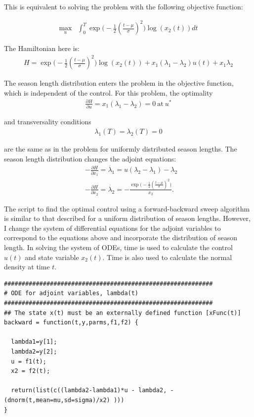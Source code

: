 \documentclass[12pt, oneside]{article}   	%
\begin{document}
This is equivalent to solving the problem with the following objective function:

\begin{align}
\max_{u} &  \int_0^T  \exp{\big(-\frac{1}{2} (\frac{t-\mu}{\sigma})^2\big)} \log( x_2(t) ) dt 
\end{align}

The Hamiltonian here is:
\begin{align}
H = \exp{\big(-\frac{1}{2} (\frac{t-\mu}{\sigma})^2\big)} \log( x_2(t) ) + x_1( \lambda_1 - \lambda_2 ) u(t) + x_1 \lambda_2
\end{align}

The season length distribution enters the problem in the objective function, which is independent of the control. For this problem, the optimality  
\begin{align}
\frac{\partial H}{\partial u} = x_1(\lambda_1 - \lambda_2) = 0\ \mathrm{at}\ u^* 
\end{align}

and transversality conditions
\begin{align}
\lambda_1(T) = \lambda_2(T) = 0
\end{align}

are the same as in the problem for uniformly distributed season lengths. The season length distribution changes the adjoint equations:
\begin{align}
&-\frac{\partial H}{\partial x_1} = \dot{\lambda_1}  = u(\lambda_2 - \lambda_1) - \lambda_2 \nonumber \\
&-\frac{\partial H}{\partial x_2} = \dot{\lambda_2}  = -\frac{  \exp{\big(-\frac{1}{2} (\frac{t-\mu}{\sigma})^2\big)}} {x_2}.
\end{align}

The script to find the optimal control using a forward-backward sweep algorithm is similar to that described for a uniform distribution of season lengths. However, I change the system of differential equations for the adjoint variables to correspond to the equations above and incorporate the distribution of season length. In solving the system of ODEs, time is used to calculate the control $u(t)$ and state variable $x_2(t)$. Time is also used to calculate the normal density at time $t$.

\begin{lstlisting}
###########################################################
# ODE for adjoint variables, lambda(t)
###########################################################
## The state x(t) must be an externally defined function [xFunc(t)]
backward = function(t,y,parms,f1,f2) {
  
  lambda1=y[1];
  lambda2=y[2];
  u = f1(t);
  x2 = f2(t);
  
  return(list(c((lambda2-lambda1)*u - lambda2, -(dnorm(t,mean=mu,sd=sigma)/x2) )))
}
\end{lstlisting}
\end{document}
